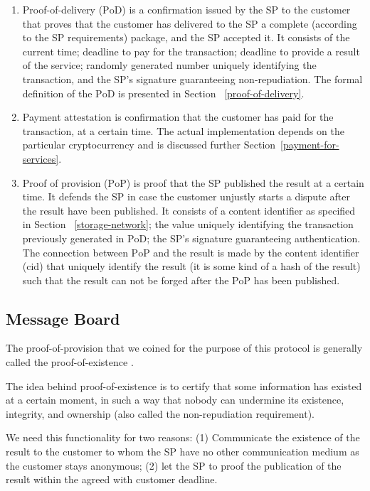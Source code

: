\documentclass{ieeeaccess}
\begin{document}
\begin{enumerate}
    \item Proof-of-delivery ($\mathrm{PoD}$) is a confirmation issued by the SP to the customer that proves that the customer has delivered to the SP a complete (according to the SP requirements) package, and the SP accepted it. It consists of the current time; deadline to pay for the transaction; deadline to provide a result of the service; randomly generated number uniquely identifying the transaction, and the SP's signature guaranteeing non-repudiation. The formal definition of the $\mathrm{PoD}$ is presented in Section ~\ref{proof-of-delivery}.
    
    \item Payment $\mathrm{attestation}$ is confirmation that the customer has paid for the transaction, at a certain time. The actual implementation depends on the particular cryptocurrency and is discussed further Section~\ref{payment-for-services}.
    
    \item Proof of provision ($\mathrm{PoP}$) is proof that the SP published the result at a certain time. It defends the SP in case the customer unjustly starts a dispute after the result have been published. It consists of a content identifier as specified in Section ~\ref{storage-network}; the value uniquely identifying the transaction previously generated in $\mathrm{PoD}$; the SP's signature guaranteeing authentication. The connection between $\mathrm{PoP}$ and the result is made by the content identifier (cid) that uniquely identify the result (it is some kind of a hash of the result) such that the result can not be forged after the $\mathrm{PoP}$ has been published.
\end{enumerate}

\subsection{Message Board}\label{message-board}
The proof-of-provision that we coined for the purpose of this protocol
is generally called the proof-of-existence
\cite{proofofexistence, de2016stampery, Chainpoi39}.

The idea behind proof-of-existence is to certify that some information
has existed at a certain moment, in such a way that nobody can
undermine its existence, integrity, and ownership (also called the
non-repudiation requirement).


We need this functionality for two reasons: (1) Communicate the existence
of the result to the customer to whom the SP have no other
communication medium as the customer stays anonymous; (2) let the SP to proof the publication of the result within the agreed with customer deadline. 
\end{document}
